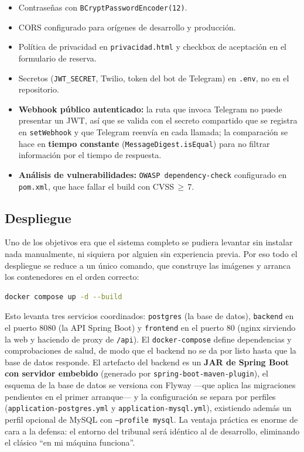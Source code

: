 \documentclass[12pt,a4paper]{report}
\begin{document}
\begin{itemize}
  \item Contraseñas con \texttt{BCryptPasswordEncoder(12)}.
  \item CORS configurado para orígenes de desarrollo y producción.
  \item Política de privacidad en \texttt{privacidad.html} y checkbox de aceptación en el formulario de reserva.
  \item Secretos (\texttt{JWT\_SECRET}, Twilio, token del bot de Telegram) en \texttt{.env}, no en el repositorio.
  \item \textbf{Webhook público autenticado:} la ruta que invoca Telegram no puede presentar un JWT, así que se valida con el secreto compartido que se registra en \texttt{setWebhook} y que Telegram reenvía en cada llamada; la comparación se hace en \textbf{tiempo constante} (\texttt{MessageDigest.isEqual}) para no filtrar información por el tiempo de respuesta.
  \item \textbf{Análisis de vulnerabilidades:} \texttt{OWASP dependency-check} configurado en \texttt{pom.xml}, que hace fallar el build con CVSS\,$\geq$\,7.
\end{itemize}

\subsection{Despliegue}

Uno de los objetivos era que el sistema completo se pudiera levantar sin instalar nada manualmente, ni siquiera por alguien sin experiencia previa. Por eso todo el despliegue se reduce a un único comando, que construye las imágenes y arranca los contenedores en el orden correcto:

\begin{lstlisting}[language=bash]
docker compose up -d --build
\end{lstlisting}

Esto levanta tres servicios coordinados: \texttt{postgres} (la base de datos), \texttt{backend} en el puerto 8080 (la API Spring Boot) y \texttt{frontend} en el puerto 80 (nginx sirviendo la web y haciendo de proxy de \texttt{/api}). El \texttt{docker-compose} define dependencias y comprobaciones de salud, de modo que el backend no se da por listo hasta que la base de datos responde. El artefacto del backend es un \textbf{JAR de Spring Boot con servidor embebido} (generado por \texttt{spring-boot-maven-plugin}), el esquema de la base de datos se versiona con Flyway —que aplica las migraciones pendientes en el primer arranque— y la configuración se separa por perfiles (\texttt{application-postgres.yml} y \texttt{application-mysql.yml}), existiendo además un perfil opcional de MySQL con \texttt{--profile mysql}. La ventaja práctica es enorme de cara a la defensa: el entorno del tribunal será idéntico al de desarrollo, eliminando el clásico ``en mi máquina funciona''.
\end{document}
